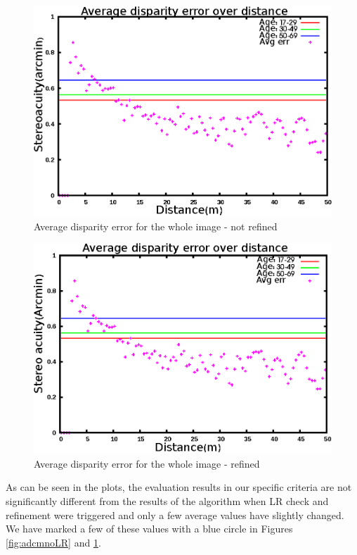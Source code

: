 \begin{figure}[H]
\centering
\includegraphics[scale=0.8]{adcenfull3NoLR}
\caption{Average disparity error for the whole image - not refined}
\label{fig:adcfnoLR}
\end{figure} 

\begin{figure}[H]
\centering
\includegraphics[scale=0.8]{adcenfull3}
\caption{Average disparity error for the whole image - refined}
\label{fig:adcf3}
\end{figure} 

As can be seen in the plots, the evaluation results in our specific criteria 
are not significantly different from the results of the algorithm when LR check and refinement were triggered
and only a few average values have slightly changed. We have marked a few of these values with a blue circle in Figures \ref{fig:adcmnoLR} and \ref{fig:adcfnoLR}.

